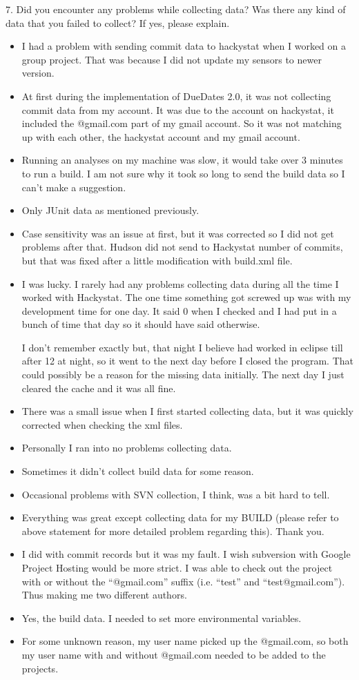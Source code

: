 7. Did you encounter any problems while collecting data? Was 
there any kind of data that you failed to collect? If yes, 
please explain. 
\begin{itemize}
\item I had a problem with sending commit data to hackystat when I worked on a group project. That was because I did not update my sensors to newer version. 
\item At first during the implementation of DueDates 2.0, it was not collecting commit data from my account. It was due to the account on hackystat, it included the @gmail.com part of my gmail account. So it was not matching up with each other, the hackystat account and my gmail account.
\item Running an analyses on my machine was slow, it would take over 3 minutes to run a build.  I am not sure why it took so long to send the build data so I can't make a suggestion.
\item Only JUnit data as mentioned previously.
\item Case sensitivity was an issue at first, but it was corrected so I did not get problems after that.  Hudson did not send to Hackystat number of commits, but that was fixed after a little modification with build.xml file.   
\item I was lucky. I rarely had any problems collecting data during all the time I worked with Hackystat. The one time something got screwed up was with my development time for one day. It said 0 when I checked and I had put in a bunch of time that day so it should have said otherwise. 

I don't remember exactly but, that night I believe had worked in eclipse till after 12 at night, so it went to the next day before I closed the program. That could possibly be a reason for the missing data initially. The next day I just cleared the cache and it was all fine.
\item There was a small issue when I first started collecting data, but it was quickly corrected when checking the xml files.
\item Personally I ran into no problems collecting data.
\item Sometimes it didn't collect build data for some reason.
\item Occasional problems with SVN collection, I think, was a bit hard to tell.
\item Everything was great except collecting data for my BUILD (please refer to above statement for more detailed problem regarding this). Thank you.
\item I did with commit records but it was my fault.  I wish subversion with Google Project Hosting would be more strict.  I was able to check out the project with or without the ``@gmail.com'' suffix (i.e. ``test'' and ``test@gmail.com'').  Thus making me two different authors.
\item Yes, the build data.  I needed to set more environmental variables. 
\item For some unknown reason, my user name picked up the @gmail.com, so both my user name with and without @gmail.com needed to be added to the projects.
\end{itemize}


